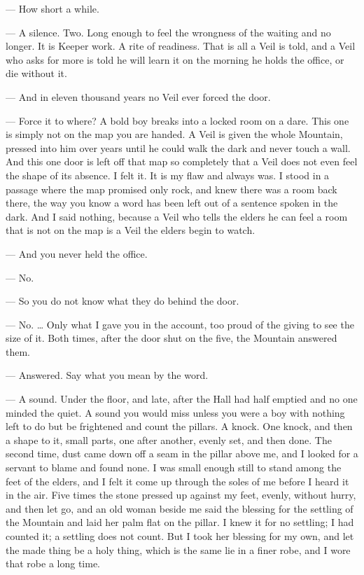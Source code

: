 \begin{room}
--- How short a while.

--- A silence. Two. Long enough to feel the wrongness of the waiting and no longer. It is Keeper work. A rite of readiness. That is all a Veil is told, and a Veil who asks for more is told he will learn it on the morning he holds the office, or die without it.

--- And in eleven thousand years no Veil ever forced the door.

--- Force it to where? A bold boy breaks into a locked room on a dare. This one is simply not on the map you are handed. A Veil is given the whole Mountain, pressed into him over years until he could walk the dark and never touch a wall. And this one door is left off that map so completely that a Veil does not even feel the shape of its absence. I felt it. It is my flaw and always was. I stood in a passage where the map promised only rock, and knew there was a room back there, the way you know a word has been left out of a sentence spoken in the dark. And I said nothing, because a Veil who tells the elders he can feel a room that is not on the map is a Veil the elders begin to watch.

--- And you never held the office.

--- No.

--- So you do not know what they do behind the door.

--- No. \ldots{} Only what I gave you in the account, too proud of the giving to see the size of it. Both times, after the door shut on the five, the Mountain answered them.

--- Answered. Say what you mean by the word.

--- A sound. Under the floor, and late, after the Hall had half emptied and no one minded the quiet. A sound you would miss unless you were a boy with nothing left to do but be frightened and count the pillars. A knock. One knock, and then a shape to it, small parts, one after another, evenly set, and then done. The second time, dust came down off a seam in the pillar above me, and I looked for a servant to blame and found none. I was small enough still to stand among the feet of the elders, and I felt it come up through the soles of me before I heard it in the air. Five times the stone pressed up against my feet, evenly, without hurry, and then let go, and an old woman beside me said the blessing for the settling of the Mountain and laid her palm flat on the pillar. I knew it for no settling; I had counted it; a settling does not count. But I took her blessing for my own, and let the made thing be a holy thing, which is the same lie in a finer robe, and I wore that robe a long time.


\end{room}
